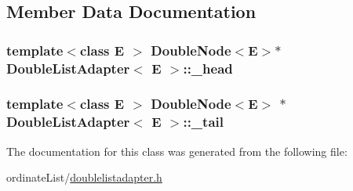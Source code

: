 \subsection{Member Data Documentation}
\hypertarget{class_double_list_adapter_a1c01340613e7545d5ab74286686053fa}{
\subsubsection[{\-\_\-head}]{\setlength{\rightskip}{0pt plus 5cm}template$<$class E $>$ {\bf Double\-Node}$<$E$>$$\ast$ {\bf Double\-List\-Adapter}$<$ E $>$\-::\-\_\-head\hspace{0.3cm}{\ttfamily [protected]}}}\label{class_double_list_adapter_a1c01340613e7545d5ab74286686053fa}
\hypertarget{class_double_list_adapter_a68c6a578e4668b8c28895ac271c4c2b9}{
\subsubsection[{\-\_\-tail}]{\setlength{\rightskip}{0pt plus 5cm}template$<$class E $>$ {\bf Double\-Node}$<$E$>$ $\ast$ {\bf Double\-List\-Adapter}$<$ E $>$\-::\-\_\-tail\hspace{0.3cm}{\ttfamily [protected]}}}\label{class_double_list_adapter_a68c6a578e4668b8c28895ac271c4c2b9}


The documentation for this class was generated from the following file\-:\begin{DoxyCompactItemize}
\item 
ordinate\-List/\hyperlink{doublelistadapter_8h}{doublelistadapter.\-h}\end{DoxyCompactItemize}
